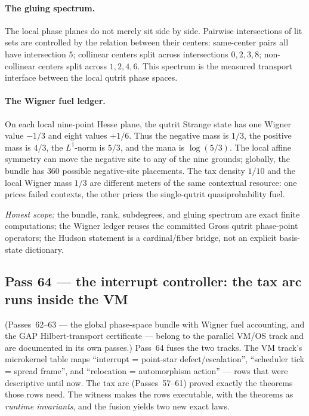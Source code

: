\documentclass[11pt]{article}
\begin{document}
\paragraph{The gluing spectrum.}  The local phase planes do not merely sit side
by side.  Pairwise intersections of lit sets are controlled by the relation
between their centers: same-center pairs all have intersection \(5\); collinear
centers split across intersections \(0,2,3,8\); non-collinear centers split
across \(1,2,4,6\).  This spectrum is the measured transport interface between
the local qutrit phase spaces.

\paragraph{The Wigner fuel ledger.}  On each local nine-point Hesse plane, the
qutrit Strange state has one Wigner value \(-1/3\) and eight values \(+1/6\).
Thus the negative mass is \(1/3\), the positive mass is \(4/3\), the
\(L^1\)-norm is \(5/3\), and the mana is \(\log(5/3)\).  The local affine
symmetry can move the negative site to any of the nine grounds; globally, the
bundle has \(360\) possible negative-site placements.  The tax density
\(1/10\) and the local Wigner mass \(1/3\) are different meters of the same
contextual resource: one prices failed contexts, the other prices the
single-qutrit quasiprobability fuel.

\emph{Honest scope:} the bundle, rank, subdegrees, and gluing spectrum are
exact finite computations; the Wigner ledger reuses the committed Gross qutrit
phase-point operators; the Hudson statement is a cardinal/fiber bridge, not an
explicit basis-state dictionary.

\subsection{Pass 64 --- the interrupt controller: the tax arc runs inside the VM}
\label{sec:capstone-sixtyfour}

(Passes~62--63 --- the global phase-space bundle with Wigner fuel accounting,
and the GAP Hilbert-transport certificate --- belong to the parallel VM/OS
track and are documented in its own passes.)  Pass~64 fuses the two tracks.
The VM track's microkernel table maps ``interrupt = point-star
defect/escalation'', ``scheduler tick = spread frame'', and ``relocation =
automorphism action'' --- rows that were descriptive until now.  The tax arc
(Passes~57--61) proved exactly the theorems those rows need.  The witness
 makes the rows executable, with
the theorems as \emph{runtime invariants}, and the fusion yields two new exact
laws.
\end{document}
